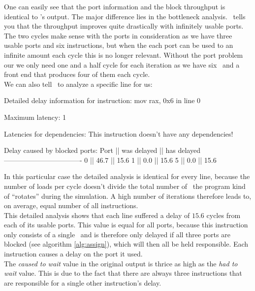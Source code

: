 One can easily see that the port information and the block throughput is identical to \iaca's output. The major difference lies in the bottleneck analysis. \suaca\ tells you that the throughput improves quite drastically with infinitely usable ports. The two cycles make sense with the ports in consideration as we have three usable ports and six instructions, but when the each port can be used to an infinite amount each cycle this is no longer relevant. Without the port problem our we only need one and a half cycle for each iteration as we have six \microops\ and a front end that produces four of them each cycle.\\
We can also tell \suaca\ to analyze a specific line for us:

\begin{example}
Detailed delay information for instruction: mov rax, 0x6 in line 0
    
            Maximum latency: 1
            
            Latencies for dependencies:
            This instruction doesn't have any dependencies!
                      
            Delay caused by blocked ports:
             Port || was delayed || has delayed
             ----------------------------------
              0   ||    46.7     ||    15.6
              1   ||     0.0     ||    15.6
              5   ||     0.0     ||    15.6
\end{example}

In this particular case the detailed analysis is identical for every line, because the number of loads per cycle doesn't divide the total number of \microops\ the program kind of ``rotates'' during the simulation. A high number of iterations therefore leads to, on average, equal number of all instructions.\\
This detailed analysis shows that each line suffered a delay of $15.6$ cycles from each of its usable ports. This value is equal for all ports, because this instruction only consists of a single \microop\ and is therefore only delayed if all three ports are blocked (see algorithm \ref{alg:assign}), which will then all be held responsible. Each instruction causes a delay on the port it used.\\
The \emph{caused to wait} value in the original output is thrice as high as the \emph{had to wait} value. This is due to the fact that there are always three instructions that are responsible for a single other instruction's delay.


